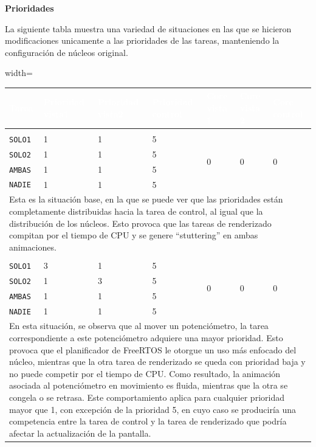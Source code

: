 \documentclass[12pt, letterpaper]{article}
\begin{document}
\textbf{Prioridades}

La siguiente tabla muestra una variedad de situaciones en las que se hicieron modificaciones unicamente a las prioridades de las tareas, manteniendo la configuración de núcleos original.

\begin{table}[H]
\begin{adjustbox}{width=\textwidth}
    \renewcommand{\arraystretch}{1.2}
    \begin{tabular}{|l|l|l|l|l|l|l|}
        \hline
        \rowcolor{MidnightBlue!80}
        \textcolor{white}{\textbf{Tarea}} & \textcolor{white}{\textbf{Prioridad vista1}} & \textcolor{white}{\textbf{Prioridad vista2}} & \textcolor{white}{\textbf{Prioridad control}} & \textcolor{white}{\textbf{Core vista 1}} & \textcolor{white}{\textbf{Core vista 2}} & \textcolor{white}{\textbf{Core control}} \\
        \hline
        \rowcolor{NavyBlue!80}
        \multicolumn{7}{|c|}{\textbf{Situación 1}} \\
        \hline
        \texttt{SOLO1} & 1 & 1 & 5 & \multirow{4}{*}{0} & \multirow{4}{*}{0} & \multirow{4}{*}{0} \\
        \texttt{SOLO2} & 1 & 1 & 5 &  &  &  \\
        \texttt{AMBAS} & 1 & 1 & 5 &  &  &  \\
        \texttt{NADIE} & 1 & 1 & 5 &  &  &  \\
        \hline
        \multicolumn{7}{|p{\textwidth}|}{
            Esta es la situación base, en la que se puede ver que las prioridades están completamente distribuidas hacia la tarea de control, al igual que la distribución de los núcleos. Esto provoca que las tareas de renderizado compitan por el tiempo de CPU y se genere ``stuttering'' en ambas animaciones.
        } \\
        \hline
        \rowcolor{NavyBlue!80}
        \multicolumn{7}{|c|}{\textbf{Situación 2}} \\
        \hline
        \texttt{SOLO1} & 3 & 1 & 5 & \multirow{4}{*}{0} & \multirow{4}{*}{0} & \multirow{4}{*}{0} \\
        \texttt{SOLO2} & 1 & 3 & 5 &  &  &  \\
        \texttt{AMBAS} & 1 & 1 & 5 &  &  &  \\
        \texttt{NADIE} & 1 & 1 & 5 &  &  &  \\
        \hline
        \multicolumn{7}{|p{\textwidth}|}{
            En esta situación, se observa que al mover un potenciómetro, la tarea correspondiente a este potenciómetro adquiere una mayor prioridad. Esto provoca que el planificador de FreeRTOS le otorgue un uso más enfocado del núcleo, mientras que la otra tarea de renderizado se queda con prioridad baja y no puede competir por el tiempo de CPU. Como resultado, la animación asociada al potenciómetro en movimiento es fluida, mientras que la otra se congela o se retrasa. Este comportamiento aplica para cualquier prioridad mayor que 1, con excepción de la prioridad 5, en cuyo caso se produciría una competencia entre la tarea de control y la tarea de renderizado que podría afectar la actualización de la pantalla.
}
\end{tabular}
\end{adjustbox}
\end{table}
\end{document}
